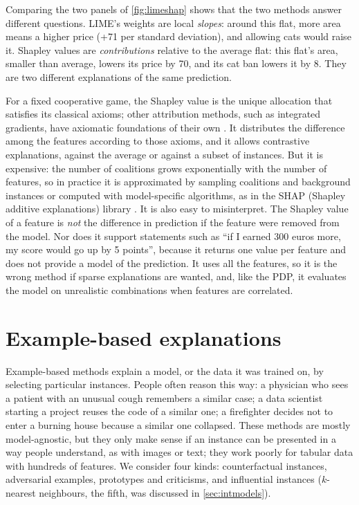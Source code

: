 Comparing the two panels of \cref{fig:limeshap} shows that the two methods answer different
questions. LIME's weights are local \emph{slopes}: around this flat, more area means a higher price
(+71 per standard deviation), and allowing cats would raise it. Shapley values are
\emph{contributions} relative to the average flat: this flat's area, smaller than average, lowers its
price by 70, and its cat ban lowers it by 8. They are two different explanations of the same prediction.

For a fixed cooperative game, the Shapley value is the unique allocation that satisfies its classical
axioms; other attribution methods, such as integrated gradients, have axiomatic foundations of their
own \citep{sundararajan2017axiomatic}. It distributes the difference among the features according to
those axioms, and it allows contrastive explanations, against the average or
against a subset of instances. But it is expensive: the number of coalitions grows exponentially with
the number of features, so in practice it is approximated by sampling coalitions and background
instances \citep{strumbelj2014explaining} or computed with model-specific algorithms, as in the SHAP
(Shapley additive explanations) library \citep{lundberg2017unified}. It is also easy to misinterpret. The Shapley value of a feature is
\emph{not} the difference in prediction if the feature were removed from the model. Nor does it
support statements such as ``if I earned 300 euros more, my score would go up by 5 points'', because it
returns one value per feature and does not provide a model of the prediction. It uses all the features, so it is the wrong method if
sparse explanations are wanted, and, like the PDP, it evaluates the model on unrealistic combinations
when features are correlated.

\section{Example-based explanations}\label{sec:examplebased}

Example-based methods explain a model, or the data it was trained on, by selecting particular
instances. People often reason this way: a physician who
sees a patient with an unusual cough remembers a similar case; a data scientist starting a project
reuses the code of a similar one; a firefighter decides not to enter a burning house because a
similar one collapsed. These methods are mostly model-agnostic, but they only make sense if an
instance can be presented in a way people understand, as with images or text; they work poorly for
tabular data with hundreds of features. We consider four kinds: counterfactual instances, adversarial
examples, prototypes and criticisms, and influential instances ($k$-nearest neighbours, the fifth,
was discussed in \cref{sec:intmodels}).

